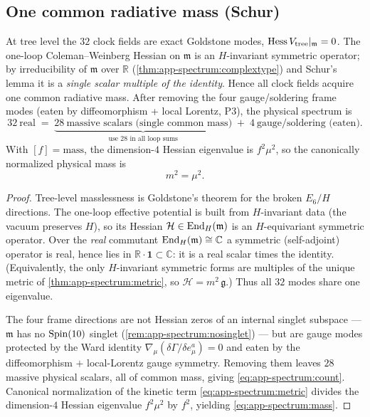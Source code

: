 \subsection{One common radiative mass (Schur)}
\label{sec:app-spectrum:mass}

\begin{theorem}
\label{thm:app-spectrum:schurmass}
At tree level the $32$ clock fields are exact Goldstone modes,
$\operatorname{Hess} V_{\mathrm{tree}}|_{\mathfrak m}=0$. The one-loop Coleman--Weinberg
Hessian on $\mathfrak m$ is an $H$-invariant symmetric operator; by
irreducibility of $\mathfrak m$ over $\mathbb R$
(\autoref{thm:app-spectrum:complextype}) and Schur's lemma it is a
\emph{single scalar multiple of the identity}. Hence all clock fields
acquire one common radiative mass. After removing the four gauge/soldering
frame modes (eaten by diffeomorphism + local Lorentz, P3), the physical
spectrum is
\begin{equation}
  32\ \text{real}\;=\;\underbrace{28\ \text{massive scalars (single common mass)}}_{\text{use }28\text{ in all loop sums}}
  \;+\;4\ \text{gauge/soldering (eaten)} .
  \label{eq:app-spectrum:count}
\end{equation}
With $[f]=\mathrm{mass}$, the dimension-$4$ Hessian eigenvalue is
$f^2\mu^2$, so the canonically normalized physical mass is
\begin{equation}
  m^2=\mu^2 .
  \label{eq:app-spectrum:mass}
\end{equation}
\end{theorem}

\begin{proof}
Tree-level masslessness is Goldstone's theorem for the broken $E_6/H$
directions. The one-loop effective potential is built from $H$-invariant
data (the vacuum preserves $H$), so its Hessian
$\mathcal H\in\operatorname{End}_H(\mathfrak m)$ is an $H$-equivariant symmetric
operator. Over the \emph{real} commutant
$\operatorname{End}_H(\mathfrak m)\cong\mathbb C$ a symmetric (self-adjoint) operator is
real, hence lies in $\mathbb R\cdot\mathbf 1\subset\mathbb C$: it is a
real scalar times the identity. (Equivalently, the only $H$-invariant
symmetric forms are multiples of the unique metric of
\autoref{thm:app-spectrum:metric}, so $\mathcal H=m^2\,\mathfrak g$.) Thus
all $32$ modes share one eigenvalue.

The four frame directions are not Hessian zeros of an internal singlet
subspace --- $\mathfrak m$ has no $\operatorname{Spin}(10)$ singlet
(\autoref{rem:app-spectrum:nosinglet}) --- but are gauge modes protected
by the Ward identity $\nabla_\mu(\delta\Gamma/\delta e^a_\mu)=0$ and eaten
by the diffeomorphism $+$ local-Lorentz gauge symmetry. Removing them
leaves $28$ massive physical scalars, all of common mass, giving
\eqref{eq:app-spectrum:count}. Canonical normalization of the
kinetic term \eqref{eq:app-spectrum:metric} divides the dimension-$4$
Hessian eigenvalue $f^2\mu^2$ by $f^2$, yielding
\eqref{eq:app-spectrum:mass}.
\end{proof}

